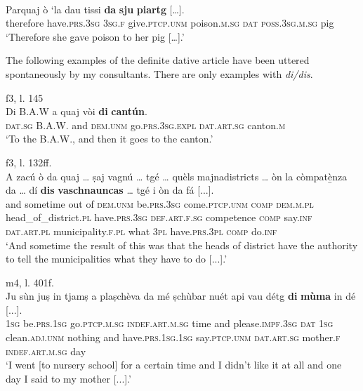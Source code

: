 \ea\label{ex:dat:indef:4}
\\
\gll Parquaj ò ‘la dau tissi \textbf{da} \textbf{sju} \textbf{piartg} […].\\
therefore have.\textsc{prs.3sg} \textsc{3sg.f} give.\textsc{ptcp.unm} poison.\textsc{m.sg} \textsc{dat} \textsc{poss.3sg.m.sg} pig \\
\glt `Therefore she gave poison to her pig […].'
\z

The following examples of the definite dative article have been uttered spontaneously by my consultants. There are only examples with \textit{di/dis}.

\ea\label{datart7}
 {f3, l. 145}\\
\gll  Di B.A.W a quaj vòi \textbf{di} \textbf{cantún}.\\
\textsc{dat.sg} B.A.W. and \textsc{dem.unm} go.\textsc{prs.3sg.expl} \textsc{dat.art.sg} canton.\textsc{m}\\
\glt `To the B.A.W., and then it goes to the canton.'
\z

\ea\label{datart8}
 {f3, l. 132ff.}\\
\gll A zacú ò da quaj … ṣaj vagnú … tgé … quèls majnadistricts … òn la còmpatè̱nza da … dí \textbf{dis} \textbf{vaschnauncas} … tgé i òn da fá [...].\\
and sometime out of \textsc{dem.unm} {} be.\textsc{prs.3sg} come.\textsc{ptcp.unm} {} \textsc{comp} {} \textsc{dem.m.pl} head\_of\_district.\textsc{pl} {} have.\textsc{prs.3sg} \textsc{def.art.f.sg} competence \textsc{comp} {} say.\textsc{inf}  \textsc{dat.art.pl} municipality.\textsc{f.pl} {} what \textsc{3pl} have.\textsc{prs.3pl}  \textsc{comp} do.\textsc{inf} \\
\glt `And sometime the result of this was that the heads of district have the authority to tell the municipalities what they have to do [...].'
\z

\ea
\label{datart9}
 {m4, l. 401f.}\\
\gll  Ju sùn juṣ in tjamṣ a plaṣchèva da mé ṣchùbar nuét api vau détg \textbf{di} \textbf{mùma} in dé [...]. \\
 \textsc{1sg} be.\textsc{prs.1sg} go.\textsc{ptcp.m.sg} \textsc{indef.art.m.sg} time and please.\textsc{impf.3sg} \textsc{dat} \textsc{1sg} clean.\textsc{adj.unm} nothing and have.\textsc{prs.1sg.1sg} say.\textsc{ptcp.unm} \textsc{dat.art.sg} mother.\textsc{f} \textsc{indef.art.m.sg} day\\
\glt `I went [to nursery school] for a certain time and I didn’t like it at all and one day I said to my mother [...].'
\z


